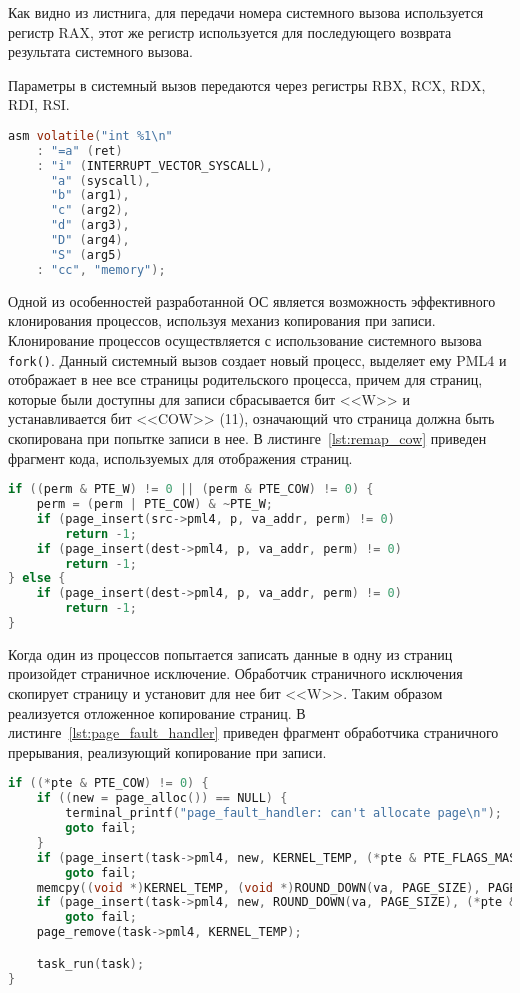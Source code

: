 Как видно из листнига, для передачи номера
системного вызова используется регистр RAX, этот же регистр используется
для последующего возврата результата системного вызова.

Параметры в системный вызов передаются через регистры RBX, RCX, RDX, RDI, RSI.

\begin{lstlisting}[language=C,
caption={Выполнение системных вызовов},
label={lst:syscall}]
asm volatile("int %1\n"
	: "=a" (ret)
	: "i" (INTERRUPT_VECTOR_SYSCALL),
	  "a" (syscall),
	  "b" (arg1),
	  "c" (arg2),
	  "d" (arg3),
	  "D" (arg4),
	  "S" (arg5)
	: "cc", "memory");
\end{lstlisting}

Одной из особенностей разработанной ОС является возможность эффективного клонирования
процессов, используя механиз копирования при записи. Клонирование процессов
осуществляется с использование системного вызова \texttt{fork()}. Данный системный
вызов создает новый процесс, выделяет ему PML4 и отображает в нее все страницы
родительского процесса, причем для страниц, которые были доступны для записи сбрасывается
бит <<W>> и устанавливается бит <<COW>> (11), означающий что страница должна быть
скопирована при попытке записи в нее. В листинге~\ref{lst:remap_cow} приведен фрагмент кода,
используемых для отображения страниц.

\begin{lstlisting}[language=C,
caption={Отображение страниц для реализации копирования при записи},
label={lst:remap_cow}]
if ((perm & PTE_W) != 0 || (perm & PTE_COW) != 0) {
	perm = (perm | PTE_COW) & ~PTE_W;
	if (page_insert(src->pml4, p, va_addr, perm) != 0)
		return -1;
	if (page_insert(dest->pml4, p, va_addr, perm) != 0)
		return -1;
} else {
	if (page_insert(dest->pml4, p, va_addr, perm) != 0)
		return -1;
}
\end{lstlisting}


Когда один из процессов попытается записать данные в одну из страниц произойдет страничное
исключение. Обработчик страничного исключения скопирует страницу и установит для нее бит <<W>>.
Таким образом реализуется отложенное копирование страниц. В листинге~\ref{lst:page_fault_handler}
приведен фрагмент обработчика страничного прерывания, реализующий копирование при записи.

\begin{lstlisting}[language=C,
caption={Фрагмент обработчика страничного исключения},
label={lst:page_fault_handler}]
if ((*pte & PTE_COW) != 0) {
	if ((new = page_alloc()) == NULL) {
		terminal_printf("page_fault_handler: can't allocate page\n");
		goto fail;
	}
	if (page_insert(task->pml4, new, KERNEL_TEMP, (*pte & PTE_FLAGS_MASK)| PTE_W) != 0)
		goto fail;
	memcpy((void *)KERNEL_TEMP, (void *)ROUND_DOWN(va, PAGE_SIZE), PAGE_SIZE);
	if (page_insert(task->pml4, new, ROUND_DOWN(va, PAGE_SIZE), (*pte & PTE_FLAGS_MASK) | PTE_W) != 0)
		goto fail;
	page_remove(task->pml4, KERNEL_TEMP);

	task_run(task);
}
\end{lstlisting}


